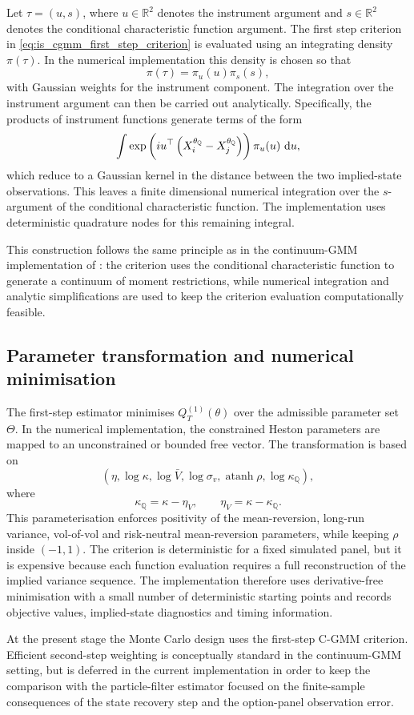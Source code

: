 \documentclass[11pt,a4paper,notitlepage]{article}
\numberwithin{equation}{section}
\begin{document}
Let \(\tau=(u,s)\), where \(u\in\mathbb R^2\) denotes the instrument argument and \(s\in\mathbb R^2\) denotes the conditional characteristic function argument. The first step criterion in \eqref{eq:is_cgmm_first_step_criterion} is evaluated using an integrating density \(\pi(\tau)\). In the numerical implementation this density is chosen so that
\[
\pi(\tau)=\pi_u(u)\pi_s(s),
\]
with Gaussian weights for the instrument component. The integration over the instrument argument can then be carried out analytically. Specifically, the products of instrument functions generate terms of the form
\[
\int
\exp\left(
iu^\top
\left(
X_i^{\theta_{\mathbb Q}}
-
X_j^{\theta_{\mathbb Q}}
\right)
\right)
\pi_u(u)\,\dif u ,
\]
which reduce to a Gaussian kernel in the distance between the two implied-state observations. This leaves a finite dimensional numerical integration over the \(s\)-argument of the conditional characteristic function. The implementation uses deterministic quadrature nodes for this remaining integral.

This construction follows the same principle as in the continuum-GMM implementation of \citet{boswijk2015asset}: the criterion uses the conditional characteristic function to generate a continuum of moment restrictions, while numerical integration and analytic simplifications are used to keep the criterion evaluation computationally feasible.

\subsection{Parameter transformation and numerical minimisation}

The first-step estimator minimises \(Q_T^{(1)}(\theta)\) over the admissible parameter set \(\Theta\). In the numerical implementation, the constrained Heston parameters are mapped to an unconstrained or bounded free vector. The transformation is based on
\[
\left(
\eta,
\log\kappa,
\log\bar V,
\log\sigma_v,
\operatorname{atanh}\rho,
\log\kappa_{\mathbb Q}
\right),
\]
where
\[
\kappa_{\mathbb Q}=\kappa-\eta_V,
\qquad
\eta_V=\kappa-\kappa_{\mathbb Q}.
\]
This parameterisation enforces positivity of the mean-reversion, long-run variance, vol-of-vol and risk-neutral mean-reversion parameters, while keeping \(\rho\) inside \((-1,1)\). The criterion is deterministic for a fixed simulated panel, but it is expensive because each function evaluation requires a full reconstruction of the implied variance sequence. The implementation therefore uses derivative-free minimisation with a small number of deterministic starting points and records objective values, implied-state diagnostics and timing information.

At the present stage the Monte Carlo design uses the first-step C-GMM criterion. Efficient second-step weighting is conceptually standard in the continuum-GMM setting, but is deferred in the current implementation in order to keep the comparison with the particle-filter estimator focused on the finite-sample consequences of the state recovery step and the option-panel observation error.


\newpage


\nocite{*}

\end{document}

